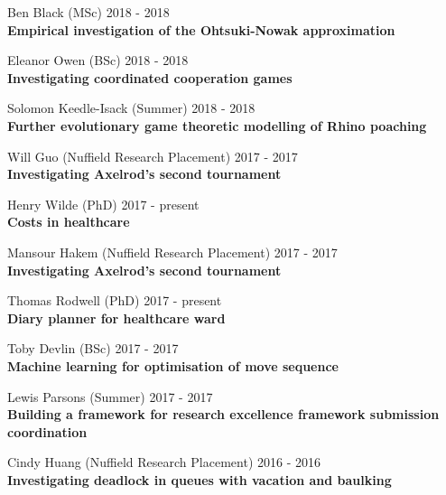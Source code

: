 \documentclass[10pt]{res} %
\begin{document}
\begin{resume}
\begin{etaremune}
\item
    Ben Black (MSc) \hfill 2018 -
    2018\\
\textbf{Empirical investigation of the Ohtsuki-Nowak approximation}\\

\item
    Eleanor Owen (BSc) \hfill 2018 -
    2018\\
\textbf{Investigating coordinated cooperation games}\\

\item
    Solomon Keedle-Isack (Summer) \hfill 2018 -
    2018\\
\textbf{Further evolutionary game theoretic modelling of Rhino poaching}\\

\item
    Will Guo (Nuffield Research Placement) \hfill 2017 -
    2017\\
\textbf{Investigating Axelrod's second tournament}\\

\item
    Henry Wilde (PhD) \hfill 2017 -
    present\\
\textbf{Costs in healthcare}\\

\item
    Mansour Hakem (Nuffield Research Placement) \hfill 2017 -
    2017\\
\textbf{Investigating Axelrod's second tournament}\\

\item
    Thomas Rodwell (PhD) \hfill 2017 -
    present\\
\textbf{Diary planner for healthcare ward}\\

\item
    Toby Devlin (BSc) \hfill 2017 -
    2017\\
\textbf{Machine learning for optimisation of move sequence}\\

\item
    Lewis Parsons (Summer) \hfill 2017 -
    2017\\
\textbf{Building a framework for research excellence framework submission coordination}\\

\item
    Cindy Huang (Nuffield Research Placement) \hfill 2016 -
    2016\\
\textbf{Investigating deadlock in queues with vacation and baulking}\\


\end{etaremune}
\end{resume}
\end{document}
